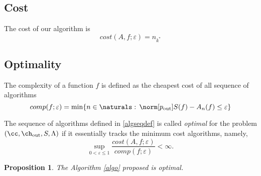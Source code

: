 \documentclass[final]{elsarticle}
\newcommand{\chout}{\ch_{\text{\rm{out}}}}
\newcommand{\pout}{p_{\text{\rm{out}}}}
\newtheorem{prop}[theorem]{Proposition}
\theoremstyle{definition}
\theoremstyle{remark}
\begin{document}
\subsection{Cost}

The cost of our algorithm is
\begin{equation}\label{costalgo}
cost(A,f;\varepsilon)=n_{k^*}
\end{equation}

\subsection{Optimality}

The complexity of a function $f$ is defined as the cheapest cost of all sequence of algorithms
\begin{equation*}
comp(f;\varepsilon)=\min\{n\in\naturals:\,\norm[\pout]{S(f)-A_n(f)} \le \varepsilon \}
\end{equation*}

The sequence of algorithms defined in \ref{algseqdef} is called \emph{optimal} for the problem $(\cc,\chout,S,\Lambda)$ if it essentially tracks the minimum cost algorithms, namely,
\begin{equation} \label{nearoptdef}
\sup_{0 < \varepsilon \le 1} \frac{cost(A,f;\varepsilon)} {comp(f;\varepsilon)} <\infty.
\end{equation}

\begin{prop}
The Algorithm \ref{algo} proposed is optimal.
\end{prop}
\end{document}
